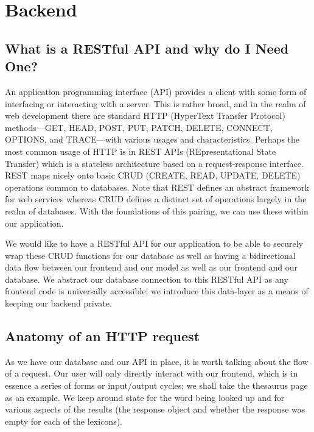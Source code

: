 \documentclass[11pt, twoside, reqno]{book}
\begin{document}
\startmain%


\chapter{Backend}



\section{What is a RESTful API and why do I Need One?}

An application programming interface (API) provides a client with some form of interfacing or interacting with a server. This is rather broad, and in the realm of web development there are standard HTTP (HyperText Transfer Protocol) methods—GET, HEAD, POST, PUT, PATCH, DELETE, CONNECT, OPTIONS, and TRACE—with various usages and characteristics. Perhaps the most common usage of HTTP is in REST APIs (REpresentational State Transfer) which is a stateless architecture based on a request-response interface. REST maps nicely onto basic CRUD (CREATE, READ, UPDATE, DELETE) operations common to databases. Note that REST defines an abstract framework for web services whereas CRUD defines a distinct set of operations largely in the realm of databases. With the foundations of this pairing, we can use these within our application.

We would like to have a RESTful API for our application to be able to securely wrap these CRUD functions for our database as well as having a bidirectional data flow between our frontend and our model as well as our frontend and our database. We abstract our database connection to this RESTful API as any frontend code is universally accessible; we introduce this data-layer as a means of keeping our backend private.

\section{Anatomy of an HTTP request}

As we have our database and our API in place, it is worth talking about the flow of a request. Our user will only directly interact with our frontend, which is in essence a series of forms or input/output cycles; we shall take the thesaurus page as an example. We keep around state for the word being looked up and for various aspects of the results (the response object and whether the response was empty for each of the lexicons).
\end{document}
